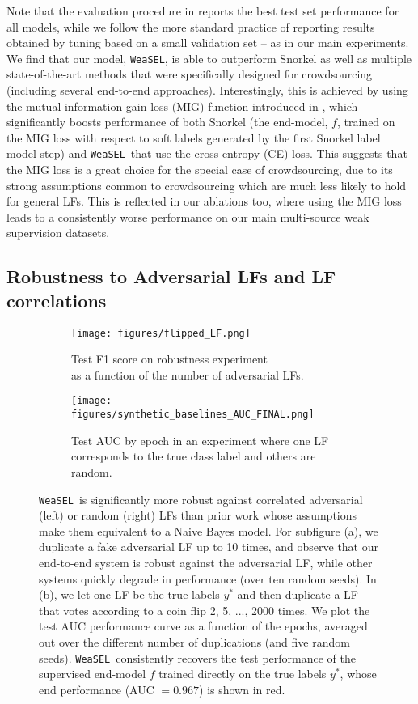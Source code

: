 \documentclass{article}
\newcommand{\weasel}{\texttt{WeaSEL}}\newcommand{\brackets}[1]{\left( #1 \right)}
\begin{document}
Note that the evaluation procedure in \cite{MaxMIG} reports the best test set performance for all models, while we follow the more standard practice of reporting results obtained by tuning based on a small validation set -- as in our main experiments.
We find that our model, \weasel, is able to outperform Snorkel as well as multiple state-of-the-art methods that were specifically designed for crowdsourcing (including several end-to-end approaches).
Interestingly, this is achieved by using the mutual information gain loss (MIG) function introduced in \cite{MaxMIG}, which significantly boosts performance of both Snorkel (the end-model, $f$, trained on the MIG loss with respect to soft labels generated by the first Snorkel label model step) and \weasel\ that use the cross-entropy (CE) loss.
This suggests that the MIG loss is a great choice for the special case of crowdsourcing, due to its strong assumptions common to crowdsourcing which are much less likely to hold for general LFs. This is reflected in our ablations too, where using the MIG loss leads to a consistently worse performance on our main multi-source weak supervision datasets.
\subsection{Robustness to Adversarial LFs and LF correlations}
\label{sec:mainRobustness}
\begin{figure}
    \begin{subfigure}{.5\textwidth}
      \centering
      \texttt{[image: figures/flipped\_LF.png]}
      \caption{Test F1 score on robustness experiment \\ as a function of the number of adversarial LFs.}
      \label{fig:noisyLF}
    \end{subfigure}\begin{subfigure}{.5\textwidth}
      \centering
      \texttt{[image: figures/synthetic\_baselines\_AUC\_FINAL.png]}
      \caption{Test AUC by epoch in an experiment where one LF corresponds to the true class label and others are random.}
      \label{fig:SynthRobustnessTestCurve}
    \end{subfigure}
    \caption{
    \weasel\ is significantly more robust against correlated adversarial (left) or random (right) LFs than prior work whose assumptions make them equivalent to a Naive Bayes model.
    For subfigure (a), we duplicate a fake adversarial LF up to 10 times, and observe that our end-to-end system is robust against the adversarial LF, while other systems quickly degrade in performance (over ten random seeds). In (b), we let one LF be the true labels $y^*$ and then duplicate a LF that votes according to a coin flip 2, 5, ..., 2000 times. We plot the test AUC performance curve as a function of the epochs, averaged out over the different number of duplications (and five random seeds). \weasel\ consistently recovers the test performance of the supervised end-model $f$ trained directly on the true labels $y^*$, whose end performance (AUC $=0.967$) is shown in red. 
}
  \label{fig:mainRobustness}
\end{figure}
\end{document}
